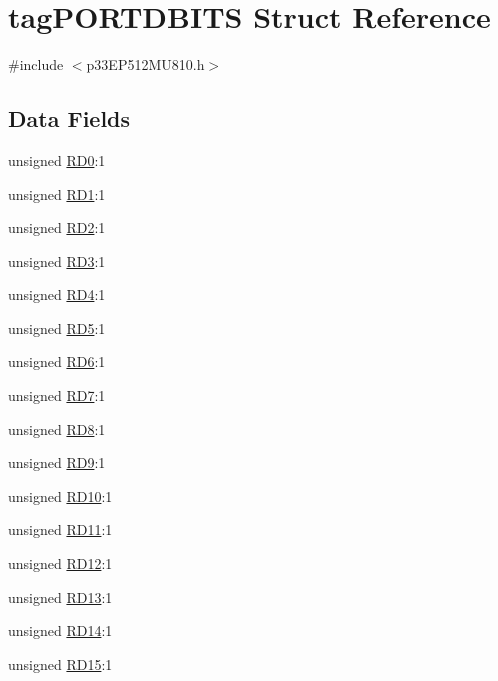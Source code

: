 \hypertarget{structtag_p_o_r_t_d_b_i_t_s}{}\section{tag\+P\+O\+R\+T\+D\+B\+I\+TS Struct Reference}
\label{structtag_p_o_r_t_d_b_i_t_s}


{\ttfamily \#include $<$p33\+E\+P512\+M\+U810.\+h$>$}

\subsection*{Data Fields}
\begin{DoxyCompactItemize}
\item 
unsigned \hyperlink{structtag_p_o_r_t_d_b_i_t_s_a5e244c0d8c44f92adf1e3fa35b83ad7b}{R\+D0}\+:1
\item 
unsigned \hyperlink{structtag_p_o_r_t_d_b_i_t_s_aaf160461556cf17b85f2e6210a87eec2}{R\+D1}\+:1
\item 
unsigned \hyperlink{structtag_p_o_r_t_d_b_i_t_s_a8226de427632c18d70f0ba436e26848d}{R\+D2}\+:1
\item 
unsigned \hyperlink{structtag_p_o_r_t_d_b_i_t_s_af17e8e4002cf3df68e9d78a35fd6c5fa}{R\+D3}\+:1
\item 
unsigned \hyperlink{structtag_p_o_r_t_d_b_i_t_s_a1e1509ac90622f2daad1f47635a9632b}{R\+D4}\+:1
\item 
unsigned \hyperlink{structtag_p_o_r_t_d_b_i_t_s_a69bfa549410c7235f9aaaeed9f406696}{R\+D5}\+:1
\item 
unsigned \hyperlink{structtag_p_o_r_t_d_b_i_t_s_abafc54b5f1adc5ed88948f006088096e}{R\+D6}\+:1
\item 
unsigned \hyperlink{structtag_p_o_r_t_d_b_i_t_s_a4b3e758ddc25f7b699b3410bf6a1c441}{R\+D7}\+:1
\item 
unsigned \hyperlink{structtag_p_o_r_t_d_b_i_t_s_a775089b0ae122f120b42eeb7814e820f}{R\+D8}\+:1
\item 
unsigned \hyperlink{structtag_p_o_r_t_d_b_i_t_s_a4183e1dad032d6abff701bf44855a53e}{R\+D9}\+:1
\item 
unsigned \hyperlink{structtag_p_o_r_t_d_b_i_t_s_a8dd50282f6c7ebc9c0bf63712f56846a}{R\+D10}\+:1
\item 
unsigned \hyperlink{structtag_p_o_r_t_d_b_i_t_s_a82f69a5aed72b0349c04c3e1e58676a0}{R\+D11}\+:1
\item 
unsigned \hyperlink{structtag_p_o_r_t_d_b_i_t_s_a2e719621e6be4abd2e6a53d1623ecc5a}{R\+D12}\+:1
\item 
unsigned \hyperlink{structtag_p_o_r_t_d_b_i_t_s_af0f00f293bbf694db384059d6074cf43}{R\+D13}\+:1
\item 
unsigned \hyperlink{structtag_p_o_r_t_d_b_i_t_s_ad7e229487817032b08d8ec86dae956d4}{R\+D14}\+:1
\item 
unsigned \hyperlink{structtag_p_o_r_t_d_b_i_t_s_a4c848d19ed1bd17d618638bcdaeb1ecd}{R\+D15}\+:1
\end{DoxyCompactItemize}


